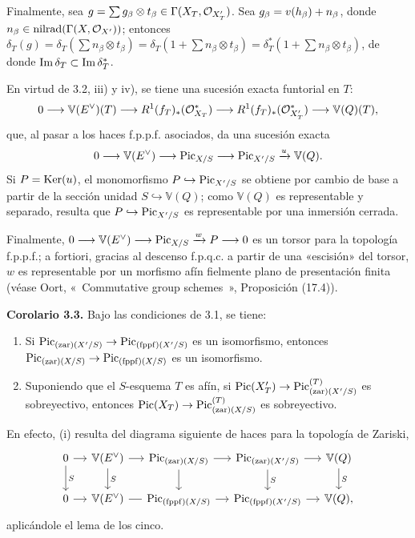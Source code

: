 Finalmente, sea
$g=\sum g_\beta\otimes\sisi{t_\alpha}{t_\beta}
\in\Gamma(X_T,\mathcal O_{X'_T})$. Sea
$g_\beta=v(\sisi{h}{h_\beta})+n_\beta$, donde
$n_\beta\in\operatorname{nilrad}
(\Gamma(X,\sisi{\mathcal O_X}{\mathcal O_{X'}}))$; entonces
$\delta_T(g)=\delta_T(\sum n_\beta\otimes t_\beta)=
\delta_T(1+\sum n_\beta\otimes t_\beta)=
\delta_T^*(1+\sum n_\beta\otimes t_\beta)$, de donde
$\im\delta_T\subset\im\delta_T^*$.

En virtud de 3.2, iii) y iv), se tiene una sucesión exacta funtorial en $T$:
\[
0\longrightarrow \mathbb V(E^\vee)(T)\longrightarrow
R^1(f_\sisi{t}{T})_*(\mathcal O_{X_T}^{*})
\longrightarrow
R^1(f_T)_*(\sisi{\mathcal O_{X'_T}}{\mathcal O_{X'_T}^{*}})
\longrightarrow
\mathbb V(Q)(T),
\]
que, al pasar a los haces f.p.p.f. asociados, da una sucesión exacta
\[
0\longrightarrow \mathbb V(E^\vee)\longrightarrow\Pic_{X/S}
\longrightarrow\Pic_{X'/S}\xrightarrow{u}\mathbb V(Q).
\]
Si $P=\Ker(u)$, el monomorfismo $P\hookrightarrow\Pic_{X'/S}$ se obtiene
por cambio de base a partir de la sección unidad
$S\hookrightarrow\mathbb V(Q)$; como $\mathbb V(Q)$ es representable y
separado, resulta que $P\hookrightarrow\Pic_{X'/S}$ es representable por
una inmersión cerrada.

Finalmente,
$0\longrightarrow\mathbb V(E^\vee)\longrightarrow\Pic_{X/S}
\xrightarrow{w}P\longrightarrow0$ es un torsor para la topología f.p.p.f.;
a fortiori, gracias al descenso f.p.q.c. a partir de una «escisión» del
torsor, $w$ es representable por un morfismo afín fielmente plano de
presentación finita (véase Oort, «~Commutative group schemes~»,
Proposición (17.4)).

\textbf{Corolario 3.3.} Bajo las condiciones de 3.1, se tiene:
\begin{enumerate}[label=\roman*)]
\item Si
$\Pic_{(\zar)(X'/S)}\to\Pic_{(\fppf)(X'/S)}$ es un isomorfismo, entonces
$\Pic_{(\zar)(X/S)}\to\Pic_{(\fppf)(X/S)}$ es un isomorfismo.
\item Suponiendo que el $S$-esquema $T$ es afín, si
$\Pic(X'_T)\to\Pic_{(\zar)(X'/S)}^{(T)}$ es sobreyectivo, entonces
$\Pic(X_T)\to\Pic_{(\zar)(X/S)}^{(T)}$ es sobreyectivo.
\end{enumerate}
En efecto, (i) resulta del diagrama siguiente de haces para la topología de
Zariski,
\[
\begin{tikzcd}[column sep=small]
0 \arrow[r] \arrow[d,"S"] & \mathbb V(E^\vee) \arrow[r] \arrow[d,"S"] &
\Pic_{(\zar)(X/S)} \arrow[r] \arrow[d] &
\Pic_{(\zar)(X'/S)} \arrow[r] \arrow[d,"S"] &
\mathbb V(Q) \arrow[d,"S"]\\
0 \arrow[r] & \mathbb V(E^\vee) \arrow[r,dash] &
\Pic_{(\fppf)(X/S)} \arrow[r] &
\Pic_{(\fppf)(X'/S)} \arrow[r] &
\mathbb V(Q),
\end{tikzcd}
\]
aplicándole el lema de los cinco.

